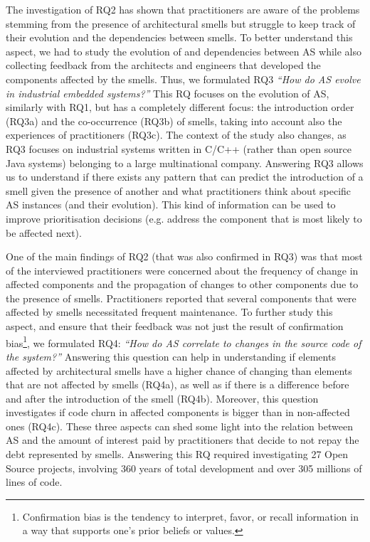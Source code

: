 The investigation of RQ2 has shown that practitioners are aware of the problems stemming from the presence of architectural smells but struggle to keep track of their evolution and the dependencies between smells.
To better understand this aspect, we had to study the evolution of and dependencies between AS while also collecting feedback from the architects and engineers that developed the components affected by the smells.
Thus, we formulated RQ3 \textit{``How do AS evolve in industrial embedded systems?''}
This RQ focuses on the evolution of AS, similarly with RQ1, but has a completely different focus: the introduction order (RQ3a) and the co-occurrence (RQ3b) of smells, taking into account also the experiences of practitioners (RQ3c).
The context of the study also changes, as RQ3 focuses on industrial systems written in C/C++ (rather than open source Java systems) belonging to a large multinational company.
Answering RQ3 allows us to understand if there exists any pattern that can predict the introduction of a smell given the presence of another and what practitioners think about specific AS instances (and their evolution).
This kind of information can be used to improve prioritisation decisions (e.g. address the component that is most likely to be affected next).

One of the main findings of RQ2 (that was also confirmed in RQ3) was that most of the interviewed practitioners were concerned about the frequency of change in affected components and the propagation of changes to other components due to the presence of smells. 
Practitioners reported that several components that were affected by smells necessitated frequent maintenance.
To further study this aspect, and ensure that their feedback was not just the result of confirmation bias\footnote{Confirmation bias is the tendency to interpret, favor, or recall information in a way that supports one's prior beliefs or values.}, we formulated RQ4: \textit{``How do AS correlate to changes in the source code of the system?''}
Answering this question can help in understanding if elements affected by architectural smells have a higher chance of changing than elements that are not affected by smells (RQ4a), as well as if there is a difference before and after the introduction of the smell (RQ4b).
Moreover, this question investigates if code churn in affected components is bigger than in non-affected ones (RQ4c).
These three aspects can shed some light into the relation between AS and the amount of interest paid by practitioners that decide to not repay the debt represented by smells.
Answering this RQ required investigating 27 Open Source projects, involving 360 years of total development and over 305 millions of lines of code.

